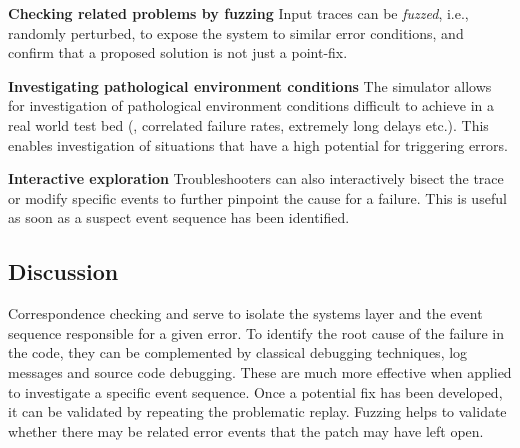 \textbf{Checking related problems by fuzzing} Input traces can be \emph{fuzzed}, i.e.,
randomly perturbed, to expose the system to similar error conditions, and confirm
that a proposed solution is not just a point-fix.

\textbf{Investigating pathological environment conditions} The simulator allows for investigation
of pathological environment conditions difficult to achieve in a real world test bed
(\eg{}, correlated failure rates, extremely long delays etc.). This enables
investigation of situations that have a high potential for triggering errors.

\textbf{Interactive exploration} Troubleshooters can also interactively bisect
the trace or modify specific events to further pinpoint the cause for a failure.
This is useful as soon as a suspect event sequence has been identified.

\subsection{Discussion}
Correspondence checking and \simulator{} serve to isolate the systems layer and
the event sequence responsible for a given error. To identify the root cause of
the failure in the code, they can be complemented by classical debugging
techniques,\ie{} log messages and source code debugging. These are much more
effective when applied to investigate a specific event sequence. Once a
potential fix has been developed, it can be validated by repeating the
problematic replay. Fuzzing helps to validate whether there may be
related error events that the patch may have left open.


